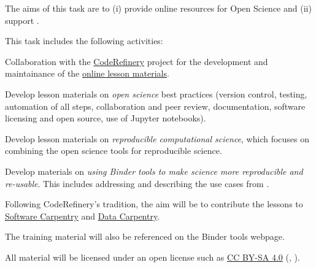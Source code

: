 \begin{task}[
  title=Online resources for reproducible science,
  id=online-resources,
  lead=UIO,
  PM=14,
  wphases={0-36!.3},
  partners={SRL,MP,UIO}
]
  The aims of this task are to (i) provide online resources for Open Science and
  (ii) support .
  
  This task includes the following activities:
  \begin{compactitem}
  \item Collaboration with the \href{https://coderefinery.org}{CodeRefinery}
    project for the development and maintainance of the
    \href{https://coderefinery.org/lessons/}{online lesson materials}.
  \item Develop lesson materials on \emph{open science} best practices (version control,
    testing, automation of all steps, collaboration and peer review,
    documentation, software licensing and open source, use of Jupyter notebooks).
  \item Develop lesson materials on \emph{reproducible computational science},
    which focuses on combining the open science tools for reproducible science.
  \item Develop materials on \emph{using Binder tools to make science more
      reproducible and re-usable}. This includes addressing and describing the
    use cases from .
  \item Following CodeRefinery's tradition, the aim will be
    to contribute the lessons to \href{https://software-carpentry.org/}{Software
      Carpentry} and \href{https://data-carpentry.org/}{Data Carpentry}.
  \item The training material will also be referenced on the Binder tools webpage.
  \end{compactitem}
  All material will be licensed under an open license such as
  \href{https://creativecommons.org/licenses/by-sa/4.0/}{CC BY-SA 4.0}
  (, ).
\end{task}
